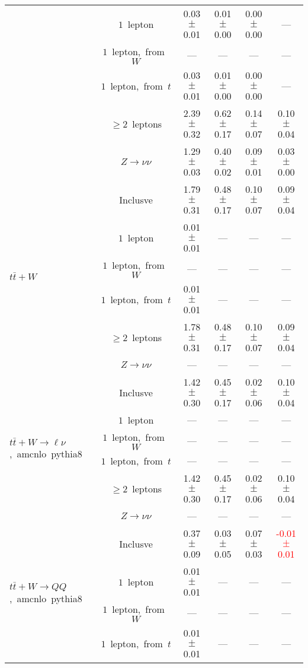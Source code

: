\documentclass{article}
\begin{document}
\begin{longtable}{|l|c|c|c|c|c|}
 & $1$~lepton  & 0.03 $\pm$ 0.01  & 0.01 $\pm$ 0.00  & 0.00 $\pm$ 0.00  & --- \\* 
 & $1$~lepton,~from~$W$  & ---  & ---  & ---  & --- \\* 
 & $1$~lepton,~from~$t$  & 0.03 $\pm$ 0.01  & 0.01 $\pm$ 0.00  & 0.00 $\pm$ 0.00  & --- \\* 
 & $\ge2$~leptons  & 2.39 $\pm$ 0.32  & 0.62 $\pm$ 0.17  & 0.14 $\pm$ 0.07  & 0.10 $\pm$ 0.04 \\* 
 & $Z\rightarrow\nu\nu$  & 1.29 $\pm$ 0.03  & 0.40 $\pm$ 0.02  & 0.09 $\pm$ 0.01  & 0.03 $\pm$ 0.00 \\* 
\hline 
\multirow{6}{*}{$t\bar{t}+W$} & Inclusve  & 1.79 $\pm$ 0.31  & 0.48 $\pm$ 0.17  & 0.10 $\pm$ 0.07  & 0.09 $\pm$ 0.04 \\* 
 & $1$~lepton  & 0.01 $\pm$ 0.01  & ---  & ---  & --- \\* 
 & $1$~lepton,~from~$W$  & ---  & ---  & ---  & --- \\* 
 & $1$~lepton,~from~$t$  & 0.01 $\pm$ 0.01  & ---  & ---  & --- \\* 
 & $\ge2$~leptons  & 1.78 $\pm$ 0.31  & 0.48 $\pm$ 0.17  & 0.10 $\pm$ 0.07  & 0.09 $\pm$ 0.04 \\* 
 & $Z\rightarrow\nu\nu$  & ---  & ---  & ---  & --- \\* 
\hline 
\multirow{6}{*}{$t\bar{t}+W{\rightarrow}{\ell}{\nu}$,~amcnlo~pythia8} & Inclusve  & 1.42 $\pm$ 0.30  & 0.45 $\pm$ 0.17  & 0.02 $\pm$ 0.06  & 0.10 $\pm$ 0.04 \\* 
 & $1$~lepton  & ---  & ---  & ---  & --- \\* 
 & $1$~lepton,~from~$W$  & ---  & ---  & ---  & --- \\* 
 & $1$~lepton,~from~$t$  & ---  & ---  & ---  & --- \\* 
 & $\ge2$~leptons  & 1.42 $\pm$ 0.30  & 0.45 $\pm$ 0.17  & 0.02 $\pm$ 0.06  & 0.10 $\pm$ 0.04 \\* 
 & $Z\rightarrow\nu\nu$  & ---  & ---  & ---  & --- \\* 
\hline 
\multirow{6}{*}{$t\bar{t}+W{\rightarrow}QQ$,~amcnlo~pythia8} & Inclusve  & 0.37 $\pm$ 0.09  & 0.03 $\pm$ 0.05  & 0.07 $\pm$ 0.03  & \textcolor{red}{ -0.01 $\pm$ 0.01 } \\* 
 & $1$~lepton  & 0.01 $\pm$ 0.01  & ---  & ---  & --- \\* 
 & $1$~lepton,~from~$W$  & ---  & ---  & ---  & --- \\* 
 & $1$~lepton,~from~$t$  & 0.01 $\pm$ 0.01  & ---  & ---  & --- \\* 

\end{longtable}
\end{document}
